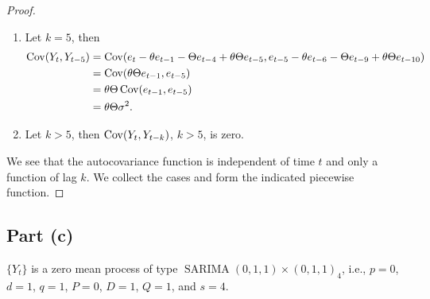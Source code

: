 \documentclass[
]{article}
\begin{document}
\begin{proof}
\begin{enumerate}
\begin{align*}
    &= -\Theta \sigma^2 - \theta\Theta^2 \sigma^2\\
    &= \sigma^2(-\Theta - \theta\Theta^2)\\
    &= -\Theta \sigma^2(1 + \theta\Theta).
\end{align*}
\item Let $k=5$, then
\begin{align*}
  \operatorname{Cov}(Y_t,Y_{t-5})
    &= \operatorname{Cov}(e_t - \theta e_{t-1} - \Theta e_{t-4} + \theta\Theta e_{t-5},
            e_{t-5} - \theta e_{t-6} - \Theta e_{t-9} + \theta\Theta e_{t-10})\\
    &= \operatorname{Cov}(\theta\Theta e_{t-1},e_{t-5})\\
    &= \theta\Theta \operatorname{Cov}(e_{t-1},e_{t-5})\\    
    &= \theta\Theta \sigma^2.
\end{align*}
\item Let $k>5$, then $\operatorname{Cov}(Y_t,Y_{t-k})$, $k>5$, is zero.
\end{enumerate}

We see that the autocovariance function is independent of time $t$ and only
a function of lag $k$.
We collect the cases and form the indicated piecewise function.
\end{proof}

\hypertarget{part-c}{%
\subsection{Part (c)}\label{part-c}}


\(\{Y_t\}\) is a zero mean process of type
\(\operatorname{SARIMA}(0,1,1)\times(0,1,1)_4\), i.e., \(p=0\), \(d=1\),
\(q=1\), \(P=0\), \(D=1\), \(Q=1\), and \(s=4\).
\end{document}
